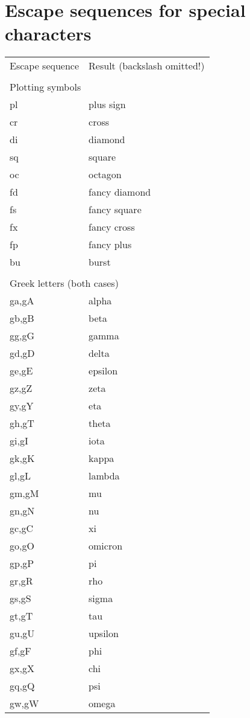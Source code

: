 \section{Escape sequences for special characters}
\par\vspace{1.0\baselineskip}
\par
\begin{tabular}{ll}
Escape sequence & Result (backslash omitted!) \\
 \\
\multicolumn{2}{l}{Plotting symbols} \\
pl & plus sign \\
cr & cross \\
di & diamond \\
sq & square \\
oc & octagon \\
fd & fancy diamond \\
fs & fancy square \\
fx & fancy cross \\
fp & fancy plus \\
bu & burst \\
 \\
\multicolumn{2}{l}{Greek letters (both cases)} \\
ga,gA & alpha \\
gb,gB & beta \\
gg,gG & gamma \\
gd,gD & delta \\
ge,gE & epsilon \\
gz,gZ & zeta \\
gy,gY & eta \\
gh,gT & theta \\
gi,gI & iota \\
gk,gK & kappa \\
gl,gL & lambda \\
gm,gM & mu \\
gn,gN & nu \\
gc,gC & xi \\
go,gO & omicron \\
gp,gP & pi \\
gr,gR & rho \\
gs,gS & sigma \\
gt,gT & tau \\
gu,gU & upsilon \\
gf,gF & phi \\
gx,gX & chi \\
gq,gQ & psi \\
gw,gW & omega
\end{tabular}

